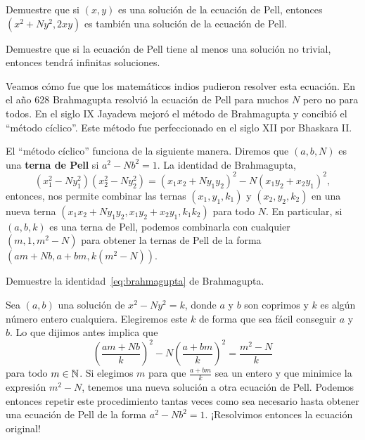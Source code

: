\begin{exercise}
	Demuestre que si $(x,y)$ es una solución de la ecuación de Pell, entonces 
	$(x^2+Ny^2,2xy)$ es también una solución de la ecuación de Pell. 
\end{exercise}

\begin{exercise}
	Demuestre que si la ecuación de Pell tiene al menos una solución no
	trivial, entonces tendrá infinitas soluciones. 
\end{exercise}

Veamos cómo fue que los matemáticos indios pudieron resolver esta ecuación.  En
el año 628 Brahmagupta resolvió la ecuación de Pell para muchos $N$  pero no
para todos. En el siglo IX Jayadeva mejoró el método de Brahmagupta y concibió
el ``método cíclico''. Este método fue perfeccionado en el siglo XII por
Bhaskara II. 

El ``método cíclico'' funciona de la siguiente manera. 
Diremos que $(a,b,N)$ es una \textbf{terna de Pell}
si $a^2-Nb^2=1$. La identidad de Brahmagupta, 
\begin{equation}
	\label{eq:brahmagupta}
	(x_1^2-Ny_1^2)(x_2^2-Ny_2^2)=(x_1x_2+Ny_1y_2)^2-N(x_1y_2+x_2y_1)^2,
\end{equation}
entonces, nos permite combinar las ternas $(x_1,y_1,k_1)$ y $(x_2,y_2,k_2)$ en
una nueva terna $(x_1x_2+Ny_1y_2,x_1y_2+x_2y_1,k_1k_2)$ para todo $N$. En
particular, si $(a,b,k)$ es una terna de Pell, podemos combinarla con cualquier
$(m,1,m^2-N)$ para obtener la ternas de Pell de la forma
$(am+Nb,a+bm,k(m^2-N))$.

\begin{exercise}
	Demuestre la identidad~\eqref{eq:brahmagupta} de Brahmagupta.
\end{exercise}

Sea $(a,b)$ una solución de $x^2-Ny^2=k$, donde $a$ y $b$ son coprimos y $k$ es
algún número entero cualquiera. Elegiremos este $k$ de forma que sea fácil
conseguir $a$ y $b$. Lo que dijimos antes implica que
\begin{equation}
	\label{eq:Pell_inductive}
	\left(\frac{am+Nb}{k}\right)^2-N\left(\frac{a+bm}{k}\right)^2=\frac{m^2-N}{k}
\end{equation}
para todo $m\in\mathbb{N}$. 
Si elegimos $m$ para que $\frac{a+bm}{k}$ sea un entero y que minimice la
expresión $m^2-N$, tenemos una nueva solución a otra ecuación de Pell. Podemos
entonces repetir este procedimiento tantas veces como sea necesario hasta
obtener una ecuación de Pell de la forma $a^2-Nb^2=1$. ¡Resolvimos entonces la ecuación original!

